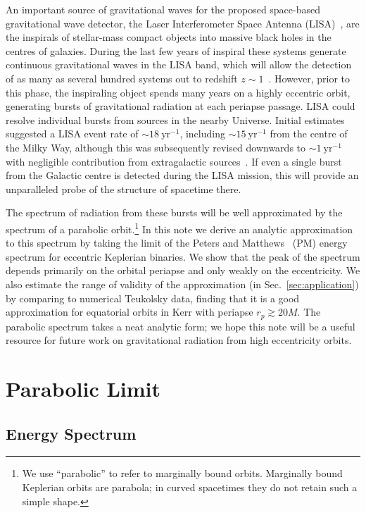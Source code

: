 \documentclass[aps,prd,amsfonts,amssymb,amsmath,nofootinbib,floatfix,reprint,showpacs,groupedaddress]{revtex4-1}
\newcommand{\secref}[1]{Sec.~\ref{sec:#1}}
\newcommand{\units}[1]{\ensuremath{~\mathrm{#1}}}
\begin{document}
An important source of gravitational waves for the proposed space-based gravitational wave detector, the Laser Interferometer Space Antenna (LISA)~\cite{Bender1998, Danzmann2003}, are the inspirals of stellar-mass compact objects into massive black holes in the centres of galaxies. During the last few years of inspiral these systems generate continuous gravitational waves in the LISA band, which will allow the detection of as many as several hundred systems out to redshift $z \sim 1$~\cite{Gair2009}. However, prior to this phase, the inspiraling object spends many years on a highly eccentric orbit, generating bursts of gravitational radiation at each periapse passage. LISA could resolve individual bursts from sources in the nearby Universe. Initial estimates~\cite{Rubbo2006} suggested a LISA event rate of $\sim18\units{yr^{-1}}$, including $\sim15\units{yr^{-1}}$ from the centre of the Milky Way, although this was subsequently revised downwards to $\sim1\units{yr^{-1}}$ with negligible contribution from extragalactic sources~\cite{Hopman2007}. If even a single burst from the Galactic centre is detected during the LISA mission, this will provide an unparalleled probe of the structure of spacetime there.

The spectrum of radiation from these bursts will be well approximated by the spectrum of a parabolic orbit.\footnote{We use ``parabolic'' to refer to marginally bound orbits. Marginally bound Keplerian orbits are parabola; in curved spacetimes they do not retain such a simple shape.} In this note we derive an analytic approximation to this spectrum by taking the limit of the Peters and Matthews~\cite{Peters1963, Peters1964} (PM) energy spectrum for eccentric Keplerian binaries. We show that the peak of the spectrum depends primarily on the orbital periapse and only weakly on the eccentricity. We also estimate the range of validity of the approximation (in \secref{application}) by comparing to numerical Teukolsky data, finding that it is a good approximation for equatorial orbits in Kerr with periapse $r_{p} \gtrsim 20M$. The parabolic spectrum takes a neat analytic form; we hope this note will be a useful resource for future work on gravitational radiation from high eccentricity orbits.

\section{Parabolic Limit\label{sec:limit}}

\subsection{Energy Spectrum}
\end{document}
